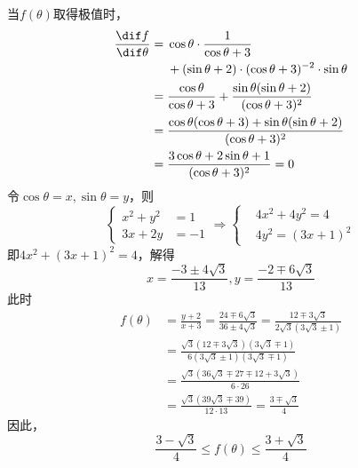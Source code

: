 当$f(\theta)$取得极值时，
\begin{align*}
  \frac{\dif f}{\dif\theta} ={}& \cos\theta\cdot\frac1{\cos\theta + 3} \\
    &+ (\sin\theta + 2)\cdot(\cos\theta + 3)^{-2}\cdot\sin\theta \\
  ={}& \frac{\cos\theta}{\cos\theta + 3} + \frac{\sin\theta(\sin\theta + 2)}{(\cos\theta + 3)^2} \\
  ={}& \frac{\cos\theta(\cos\theta + 3) + \sin\theta(\sin\theta + 2)}{(\cos\theta + 3)^2} \\
  ={}& \frac{3\cos\theta + 2\sin\theta + 1}{(\cos\theta + 3)^2} = 0
\end{align*}
令$\cos\theta = x, \sin\theta = y$，则
\[ \left\{\begin{aligned}
  x^2 + y^2 &= 1 \\ 3x + 2y &= -1
\end{aligned}\right. \Rightarrow
\left\{\begin{aligned}
  & 4x^2 + 4y^2 = 4 \\ & 4y^2 = (3x + 1)^2
\end{aligned}\right. \]
即$4x^2 + (3x + 1)^2 = 4$，解得
\[ x = \frac{-3 \pm4\sqrt3}{13}, y = \frac{-2 \mp6\sqrt3}{13} \]
此时
\begin{align*}
  f(\theta) &= \frac{y + 2}{x + 3} = \frac{24 \mp6\sqrt3}{36 \pm4\sqrt3} = \frac{12 \mp3\sqrt3}{2\sqrt3\left(3\sqrt3 \pm1\right)} \\
  &= \frac{\sqrt3\left(12 \mp3\sqrt3\right)\left(3\sqrt3 \mp1\right)}{6\left(3\sqrt3 \pm1\right)\left(3\sqrt3 \mp1\right)} \\
  &= \frac{\sqrt3\left(36\sqrt3 \mp27 \mp12 + 3\sqrt3\right)}{6\cdot26} \\
  &= \frac{\sqrt3\left(39\sqrt3 \mp39\right)}{12\cdot13} = \frac{3 \mp\sqrt3}4
\end{align*}
因此，
\[ \frac{3 - \sqrt3}4 \le f(\theta) \le \frac{3 + \sqrt3}4 \]
